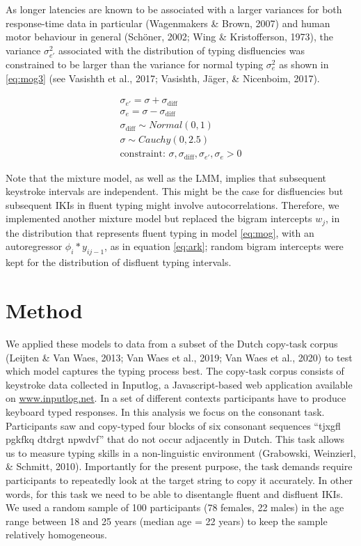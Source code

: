 \documentclass[english,jou,floatsintext]{apa7}
\begin{document}
As longer latencies are known to be associated with a larger variances for both response-time data in particular (Wagenmakers \& Brown, 2007) and human motor behaviour in general (Schöner, 2002; Wing \& Kristofferson, 1973), the variance \(\sigma_{e'}^2\) associated with the distribution of typing disfluencies was constrained to be larger than the variance for normal typing \(\sigma_e^2\) as shown in \ref{eq:mog3} (see Vasishth et al., 2017; Vasishth, Jäger, \& Nicenboim, 2017).

\[
\tag{9}
\begin{aligned}
        \sigma_{e'} = \sigma + \sigma_{\text{diff}}\\
        \sigma_{e} = \sigma - \sigma_{\text{diff}}\\
        \sigma_{\text{diff}} \sim Normal(0,1)\\
        \sigma \sim Cauchy(0,2.5)\\
        \text{constraint: } \sigma, \sigma_{\text{diff}}, \sigma_{e'}, \sigma_{e} > 0
\end{aligned}   
\label{eq:mog3}
\]

Note that the mixture model, as well as the LMM, implies that subsequent keystroke intervals are independent. This might be the case for disfluencies but subsequent IKIs in fluent typing might involve autocorrelations. Therefore, we implemented another mixture model but replaced the bigram intercepts \(w_j\), in the distribution that represents fluent typing in model \ref{eq:mog}, with an autoregressor \(\phi_i*y_{ij-1}\), as in equation \ref{eq:ark}; random bigram intercepts were kept for the distribution of disfluent typing intervals.

\hypertarget{method}{%
\section{Method}\label{method}}

We applied these models to data from a subset of the Dutch copy-task corpus (Leijten \& Van Waes, 2013; Van Waes et al., 2019; Van Waes et al., 2020) to test which model captures the typing process best. The copy-task corpus consists of keystroke data collected in Inputlog, a Javascript-based web application available on \url{www.inputlog.net}. In a set of different contexts participants have to produce keyboard typed responses. In this analysis we focus on the consonant task. Participants saw and copy-typed four blocks of six consonant sequences \enquote{tjxgfl pgkfkq dtdrgt npwdvf} that do not occur adjacently in Dutch. This task allows us to measure typing skills in a non-linguistic environment (Grabowski, Weinzierl, \& Schmitt, 2010). Importantly for the present purpose, the task demands require participants to repeatedly look at the target string to copy it accurately. In other words, for this task we need to be able to disentangle fluent and disfluent IKIs. We used a random sample of 100 participants (78 females, 22 males) in the age range between 18 and 25 years (median age = 22 years) to keep the sample relatively homogeneous.
\end{document}
